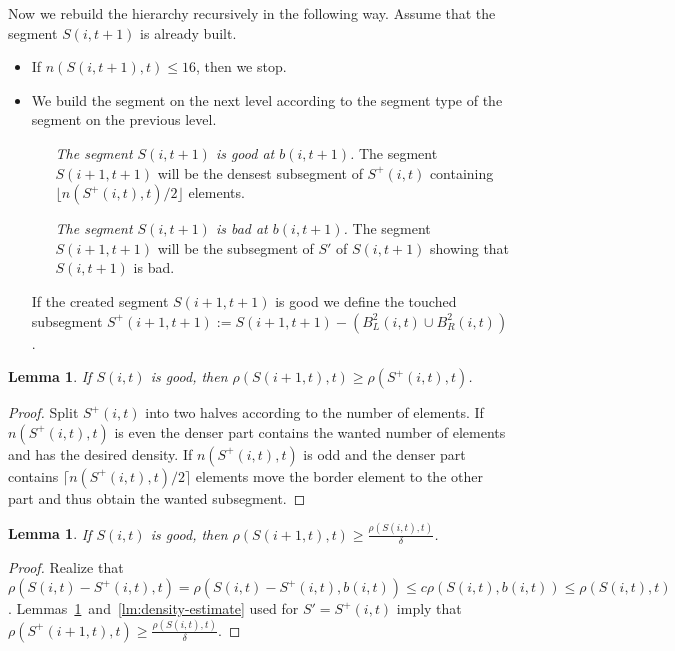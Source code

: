 \documentclass[11pt]{article} %
\newcommand{\density}[2]{\rho(#1, #2)}
\newcommand{\scount}[2]{n(#1, #2)}
\newcommand{\segment}[2]{S(#1, #2)}
\newcommand{\segmentt}[2]{S^+(#1, #2)}
\newtheorem{lemma}[definition]{Lemma}
\begin{document}
Now we rebuild the hierarchy recursively in the following way.
Assume that the segment $\segment{i}{t + 1}$ is already built.
\begin{itemize}
	\item If $\scount{\segment{i}{t + 1}}{t} \leq 16$, then we stop.
	\item We build the segment on the next level according to the segment type of the segment on the previous level.
		\begin{itemize}
			\item[\emph{The segment $\segment{i}{t + 1}$ is good at $b(i, t + 1)$.}] The segment $\segment{i + 1}{t + 1}$ will be the densest subsegment of $\segmentt{i}{t}$ containing $\lfloor\scount{\segmentt{i}{t}}{t}/2\rfloor$ elements.
			\item[\emph{The segment $\segment{i}{t + 1}$ is bad at $b(i, t + 1)$.}] The segment $\segment{i + 1}{t + 1}$ will be the subsegment of $S'$ of $\segment{i}{t + 1}$ showing that $\segment{i}{t + 1}$ is bad.
		\end{itemize}
		If the created segment $\segment{i + 1}{t + 1}$ is good we define the touched subsegment $\segmentt{i + 1}{t + 1} := \segment{i + 1}{t + 1} - (B^2_L(i, t) \cup B^2_R(i, t))$.
\end{itemize}

\begin{lemma}
\label{lm:pigeonhole-density}
If $\segment{i}{t}$ is good, then $\density{\segment{i + 1}{t}}{t} \geq \density{\segmentt{i}{t}}{t}$.
\end{lemma}
\begin{proof}
Split $\segmentt{i}{t}$ into two halves according to the number of elements.
If $\scount{\segmentt{i}{t}}{t}$ is even the denser part contains the wanted number of elements and has the desired density.
If $\scount{\segmentt{i}{t}}{t}$ is odd and the denser part contains $\lceil\scount{\segmentt{i}{t}}{t}/2\rceil$ elements move the border element to the other part and thus obtain the wanted subsegment.
\end{proof}

\begin{lemma}
If $\segment{i}{t}$ is good, then $\density{\segment{i + 1}{t}}{t} \geq \frac{\density{\segment{i}{t}}{t}}{\delta}$.
\end{lemma}
\begin{proof}
Realize that $\density{\segment{i}{t} - \segmentt{i}{t}}{t} = \density{\segment{i}{t} - \segmentt{i}{t}}{b(i, t)} \leq c \density{\segment{i}{t}}{b(i, t)} \leq \density{\segment{i}{t}}{t}$.
Lemmas~\ref{lm:pigeonhole-density}~and~\ref{lm:density-estimate} used for $S' = \segmentt{i}{t}$ imply that $\density{\segmentt{i + 1}{t}}{t} \geq \frac{\density{\segment{i}{t}}{t}}{\delta}$.
\end{proof}
\end{document}
